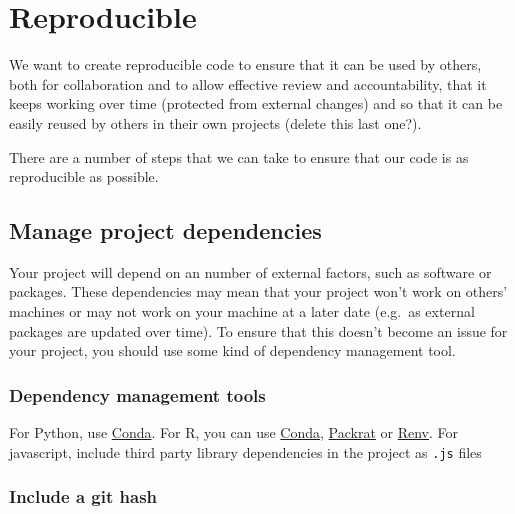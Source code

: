 \documentclass[]{book}
\begin{document}
\hypertarget{reproduce}{%
\chapter{Reproducible}\label{reproduce}}

We want to create reproducible code to ensure that it can be used by others, both for collaboration and to allow effective review and accountability, that it keeps working over time (protected from external changes) and so that it can be easily reused by others in their own projects (delete this last one?).

There are a number of steps that we can take to ensure that our code is as reproducible as possible.

\hypertarget{projdep}{%
\section{Manage project dependencies}\label{projdep}}

Your project will depend on an number of external factors, such as software or packages. These dependencies may mean that your project won't work on others' machines or may not work on your machine at a later date (e.g.~as external packages are updated over time). To ensure that this doesn't become an issue for your project, you should use some kind of dependency management tool.

\hypertarget{dependency-management-tools}{%
\subsection*{Dependency management tools}\label{dependency-management-tools}}

For Python, use \href{https://github.com/moj-analytical-services/coffee-and-coding-public/blob/master/2019-10-30\%20Conda/conda.pdf}{Conda}.
For R, you can use \href{https://github.com/moj-analytical-services/coffee-and-coding-public/blob/master/2019-10-30\%20Conda/conda.pdf}{Conda}, \href{https://rstudio.github.io/packrat/}{Packrat} or \href{https://blog.rstudio.com/2019/11/06/renv-project-environments-for-r/}{Renv}.
For javascript, include third party library dependencies in the project as \texttt{.js} files

\hypertarget{githash}{%
\subsection*{Include a git hash}\label{githash}}
\end{document}
